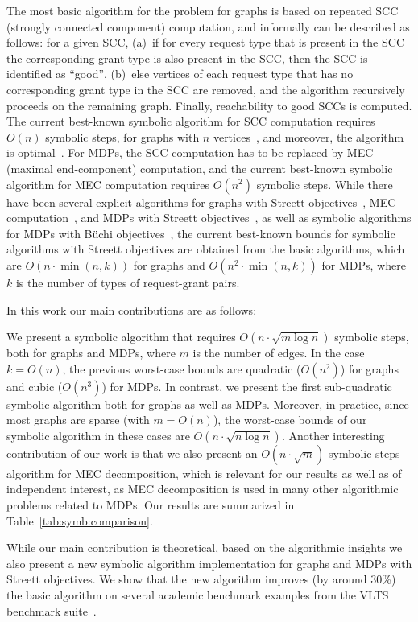 \vspace{-0.5mm}
\smallskip{}
The most basic algorithm for the problem for graphs is based on repeated SCC (strongly
connected component) computation, and informally can be described as follows:
for a given SCC, (a)~if for every request type that is present in the SCC 
the corresponding grant type is also present in the SCC, then the SCC is identified 
as ``good'', (b)~else vertices of each request type that has no corresponding
grant type in the SCC are removed, and the algorithm recursively proceeds
on the remaining graph.
Finally, reachability to good SCCs is computed. 
The current best-known symbolic algorithm for SCC computation requires $O(n)$ symbolic
steps, for graphs with $n$ vertices~\cite{GentiliniPP08}, and moreover, the algorithm is optimal~\cite{ChatterjeeDHL18}.
For MDPs, the SCC computation has to be replaced by MEC (maximal end-component) computation,
and the current best-known symbolic algorithm for MEC computation requires $O(n^2)$ symbolic steps.
While there have been several explicit algorithms for graphs with Streett 
objectives~\cite{HenzingerT96,ChatterjeeHL15}, MEC computation~\cite{ChatterjeeH11,ChatterjeeH12,ChatterjeeH14}, 
and MDPs with Streett objectives~\cite{ChatterjeeDHL16}, as well as symbolic algorithms for MDPs with 
B\"uchi objectives~\cite{ChatterjeeHJS13}, the current best-known bounds for symbolic algorithms 
with Streett objectives are obtained from the basic algorithms, which are $O(n \cdot \min(n,k))$ 
for graphs and $O(n^2\cdot \min(n,k))$ for MDPs, where $k$ is the number of types of request-grant pairs.

\vspace{-0.5mm}
\smallskip{}
In this work our main contributions are as follows:
\begin{compactitem}
\item We present a symbolic algorithm that requires $O(n \cdot \sqrt{m \log n})$ symbolic steps,
both for graphs and MDPs, where $m$ is the number of edges. 
In the case $k=O(n)$, the previous worst-case bounds are quadratic ($O(n^2)$) for graphs and 
cubic ($O(n^3)$) for MDPs.
In contrast, we present the first sub-quadratic symbolic algorithm both for graphs as well as MDPs.
Moreover, in practice, since most graphs are sparse (with $m=O(n)$), the worst-case bounds of 
our symbolic algorithm in these cases are $O(n \cdot \sqrt{n\log n})$.
Another interesting contribution of our work is that we also present an $O(n \cdot \sqrt{m})$ symbolic 
steps algorithm for MEC decomposition, which is relevant for our results as well as of 
independent interest, as MEC decomposition is used in many other algorithmic problems 
related to MDPs.
Our results are summarized in Table~\ref{tab:symb:comparison}.

\item While our main contribution is theoretical, based on the algorithmic insights we 
also  present a new symbolic algorithm implementation for graphs and MDPs with Streett objectives. 
We show that the new algorithm improves (by around 30\%) the basic algorithm 
on several academic benchmark examples from the VLTS benchmark suite~\cite{VLTS}.
\end{compactitem}

